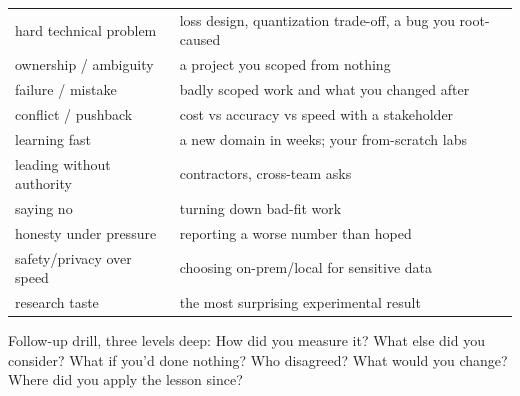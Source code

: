 \begin{mem}
\begin{tabularx}{\linewidth}{@{}lL@{}}
\toprule
hard technical problem & loss design, quantization trade-off, a bug you root-caused\\
ownership / ambiguity & a project you scoped from nothing\\
failure / mistake & badly scoped work and what you changed after\\
conflict / pushback & cost vs accuracy vs speed with a stakeholder\\
learning fast & a new domain in weeks; your from-scratch labs\\
leading without authority & contractors, cross-team asks\\
saying no & turning down bad-fit work\\
honesty under pressure & reporting a worse number than hoped\\
safety/privacy over speed & choosing on-prem/local for sensitive data\\
research taste & the most surprising experimental result\\\bottomrule
\end{tabularx}\par\smallskip
{\scriptsize Follow-up drill, three levels deep: How did you measure it? What else did you consider? What if you'd done nothing? Who disagreed? What would you change? Where did you apply the lesson since?}
\end{mem}

